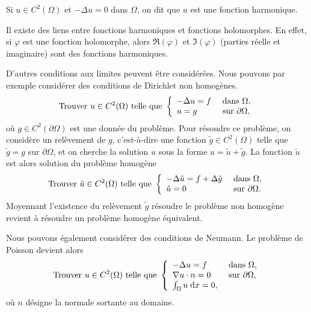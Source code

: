 \documentclass[12pt,a4paper,twoside]{article}
\begin{document}


\begin{definition}
  Si $u \in C^2(\Omega)$ et $- \Delta u = 0$ dans $\Omega$,
  on dit que $u$ est une fonction harmonique.
\end{definition}

Il existe des liens entre fonctions harmoniques et fonctions holomorphes.
En effet, si $\varphi$ est une fonction holomorphe,
alors $\Re(\varphi)$ et $\Im(\varphi)$ (parties r\'eelle et imaginaire)
sont des fonctions harmoniques.


D'autres conditions aux limites peuvent \^etre consid\'er\'ees.
Nous pouvons par exemple consid\'erer des conditions de Dirichlet 
non homog\`enes.
\begin{equation*}
  \text{Trouver $u \in C^2(\Omega)$ telle que  }
  \left\{
    \begin{array}{l l}
      - \Delta u = f &\text{ dans } \Omega ,
      \\
      u = g &\text{ sur } \partial \Omega ,
    \end{array}
  \right.
\end{equation*}
o\`u $g \in C^2(\partial \Omega)$ est une donn\'ee du probl\`eme.
Pour r\'esoudre ce probl\`eme, on consid\`ere un rel\`evement de $g$,
c'est-\`a-dire une fonction $\tilde{g} \in C^2(\Omega)$ telle que
$\tilde{g} = g$ sur $\partial \Omega$,
et on cherche la solution $u$ sous la forme
$u = \tilde{u} + \tilde{g}$.
La fonction $\tilde{u}$ est alors solution du probl\`eme
homog\`ene
\begin{equation*}
  \text{Trouver $\tilde{u} \in C^2(\Omega)$ telle que  }
  \left\{
    \begin{array}{l l}
      - \Delta \tilde{u} = f + \Delta \tilde{g} &\text{ dans } \Omega ,
      \\
      \tilde{u} = 0 &\text{ sur } \partial \Omega .
    \end{array}
  \right.
\end{equation*}
Moyennant l'existence du rel\`evement $\tilde{g}$
r\'esoudre le probl\`eme non homog\`ene revient \`a 
r\'esoudre un probl\`eme homog\`ene \'equivalent.


Nous pouvons \'egalement consid\'erer des conditions
de Neumann. Le probl\`eme de Poisson devient alors
\begin{align}
  \label{eq:ell_Neu}
  \text{Trouver $u \in C^2(\Omega)$ telle que  }
  \left\{
    \begin{array}{l l}
      - \Delta u = f &\text{ dans } \Omega ,
      \\
      \nabla u \cdot n = 0 &\text{ sur } \partial \Omega ,
      \\
      \int_{\Omega} u \;\mathrm{d} x = 0 ,
    \end{array}
  \right.
\end{align}
o\`u $n$ d\'esigne la normale sortante au domaine.
\end{document}
